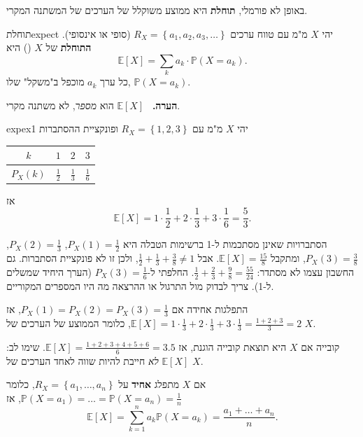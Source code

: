 \documentclass[11pt,a4paper]{report}
\newenvironment{remark}{\par\smallskip\noindent\textsf{\textbf{הערה.}}\ }{\par\smallskip}
\newcommand{\set}[1]{\left\{#1\right\}}
\newcommand{\PP}{\mathbb{P}}
\newcommand{\E}{\mathbb{E}}
\begin{document}
באופן לא פורמלי, \textbf{תוחלת} היא ממוצע משוקלל של הערכים של המשתנה המקרי.

\begin{definition}{תוחלת}{expect}
יהי $X$ מ"מ עם טווח ערכים $R_X=\set{a_1,a_2,a_3,\dots}$ (סופי או אינסופי). \textbf{התוחלת} של $X$ () היא
\[
  \E[X]=\sum_k a_k\cdot\PP(X=a_k).
\]
כל ערך $a_k$ מוכפל ב"משקל" שלו, $\PP(X=a_k)$.
\end{definition}

\begin{remark}
$\E[X]$ הוא \emph{מספר}, לא משתנה מקרי.
\end{remark}

\begin{example}{}{expex1}
יהי $X$ מ"מ עם $R_X=\set{1,2,3}$ ופונקציית ההסתברות
\begin{center}
\renewcommand{\arraystretch}{1.3}
\begin{tabular}{c|ccc}
  $k$ & $1$ & $2$ & $3$\\ \hline
  $P_X(k)$ & $\frac12$ & $\frac13$ & $\frac16$
\end{tabular}
\end{center}
אז
\[
  \E[X]=1\cdot\frac12+2\cdot\frac13+3\cdot\frac16=\frac53.
\]
\end{example}

\begin{attention}{הסתברויות שאינן מסתכמות ל-1}
ברשימות הטבלה היא $P_X(1)=\frac12$, $P_X(2)=\frac13$, $P_X(3)=\frac38$, ומתקבל $\E[X]=\frac{15}{8}$. אבל $\frac12+\frac13+\frac38\neq1$, ולכן זו לא פונקציית הסתברות. גם החשבון עצמו לא מסתדר: $\frac12+\frac23+\frac98=\frac{55}{24}$. החלפתי ל-$P_X(3)=\frac16$ (הערך היחיד שמשלים ל-1). צריך לבדוק מול התרגול או ההרצאה מה היו המספרים המקוריים.
\end{attention}

\begin{example}{התפלגות אחידה}{}
אם $P_X(1)=P_X(2)=P_X(3)=\frac13$, אז
$\E[X]=1\cdot\frac13+2\cdot\frac13+3\cdot\frac13=\frac{1+2+3}3=2$, כלומר הממוצע של הערכים של $X$.
\end{example}

\begin{example}{קובייה}{}
אם $X$ היא תוצאת קובייה הוגנת, אז $\E[X]=\frac{1+2+3+4+5+6}{6}=3.5$.
שימו לב: $\E[X]$ \emph{לא} חייבת להיות שווה לאחד הערכים של $X$.
\end{example}

\begin{keybox}[title={כלל}]
אם $X$ מתפלג \textbf{אחיד} על $R_X=\set{a_1,\dots,a_n}$, כלומר $\PP(X=a_1)=\dots=\PP(X=a_n)=\frac1n$, אז
\[
  \E[X]=\sum_{k=1}^n a_k\PP(X=a_k)=\frac{a_1+\dots+a_n}{n}.
\]
\end{keybox}
\end{document}
